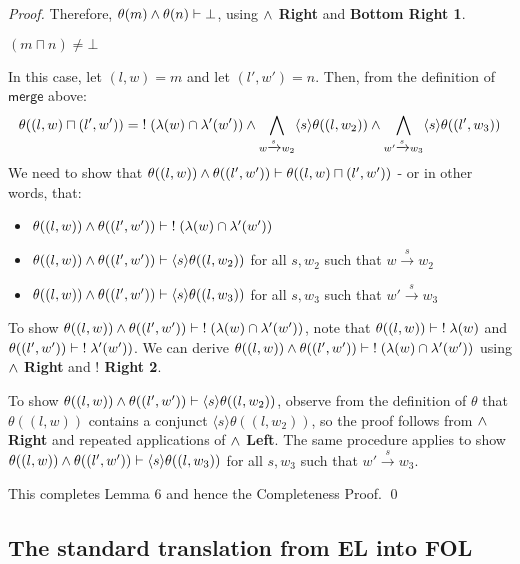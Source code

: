 \begin{proof}
Therefore,  $\theta(m) \land \theta(n) \vdash \bot$, using  {\bf $\land$ Right} and  {\bf Bottom Right 1}.
\begin{mycase}
$(m \sqcap n) \neq \bot$
\end{mycase}
In this case, let $(l,w) = m$ and let $(l',w')=n$.
Then, from the definition of $\mathsf{merge}$ above:
\[
\theta((l,w) \sqcap (l',w')) = \; ! \; (\lambda(w) \cap \lambda'(w')) \land \bigwedge_{w \xrightarrow{s} w_2} \langle s \rangle \theta((l, w_2)) \land \bigwedge_{w' \xrightarrow{s} w_3} \langle s \rangle \theta((l', w_3))
\]
We need to show that $\theta((l,w)) \land \theta((l',w')) \vdash \theta((l,w) \sqcap (l',w'))$ - or in other words, that:
\begin{itemize}
\item
$\theta((l,w)) \land \theta((l',w')) \vdash \; ! \; (\lambda(w) \cap \lambda'(w'))$
\item
$\theta((l,w)) \land \theta((l',w')) \vdash \langle s \rangle \theta((l, w_2))$ for all $s,w_2$ such that $w \xrightarrow{s} w_2$
\item
$\theta((l,w)) \land \theta((l',w')) \vdash \langle s \rangle \theta((l, w_3))$ for all $s,w_3$ such that $w' \xrightarrow{s} w_3$
\end{itemize}
To show $\theta((l,w)) \land \theta((l',w')) \vdash \; ! \; (\lambda(w) \cap \lambda'(w'))$, note that $\theta((l,w))  \vdash \; ! \; \lambda(w)$ and $\theta((l',w')) \vdash \; ! \;  \lambda'(w'))$.
We can derive $\theta((l,w)) \land \theta((l',w')) \vdash \; ! \; (\lambda(w) \cap \lambda'(w'))$ using {\bf $\land$ Right} and {\bf $!$ Right 2}. 

To show $\theta((l,w)) \land \theta((l',w')) \vdash \langle s \rangle \theta((l, w_2))$, observe from the definition of $\theta$ that $\theta((l,w))$ contains a conjunct $\langle s \rangle \theta((l, w_2))$, so the proof follows from  {\bf $\land$ Right} and repeated applications of  {\bf $\land$ Left}. The same procedure applies to show $\theta((l,w)) \land \theta((l',w')) \vdash \langle s \rangle \theta((l, w_3))$ for all $s,w_3$ such that $w' \xrightarrow{s} w_3$.

This completes Lemma 6 and hence the Completeness Proof.
\qed

\end{proof}

\subsection{The standard translation from  EL into FOL}

